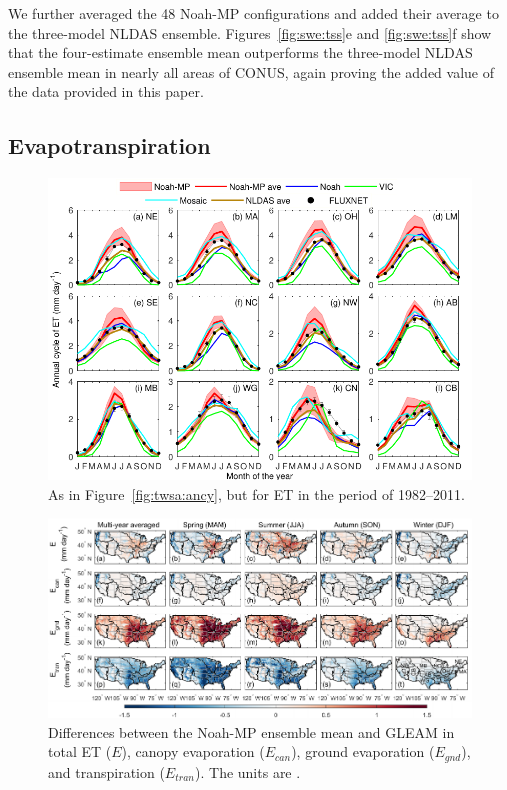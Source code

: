 \documentclass[essd, manuscript]{copernicus}
\let\unit\undefined
\begin{document}
We further averaged the 48 Noah-MP configurations and added their average to the three-model NLDAS ensemble. Figures~\ref{fig:swe:tss}e and \ref{fig:swe:tss}f show that the four-estimate ensemble mean outperforms the three-model NLDAS ensemble mean in nearly all areas of CONUS, again proving the added value of the data provided in this paper.

\subsection{Evapotranspiration}\label{sec:results:et}

\begin{figure}[t]
  \includegraphics[width=14cm]{fig/fig10.pdf}
  \caption{As in Figure~\ref{fig:twsa:ancy}, but for ET in the period of 1982--2011.}
  \label{fig:et:ancy}
\end{figure}

\begin{figure}[t]
  \includegraphics[width=17cm]{fig/fig11.pdf}
  \caption{Differences between the Noah-MP ensemble mean and GLEAM in total ET (\(E\)), canopy evaporation (\(E_{can}\)), ground evaporation (\(E_{gnd}\)), and transpiration (\(E_{tran}\)). The units are \unit{mm.day^{-1}}.}
  \label{fig:et:decomp}
\end{figure}
\end{document}

